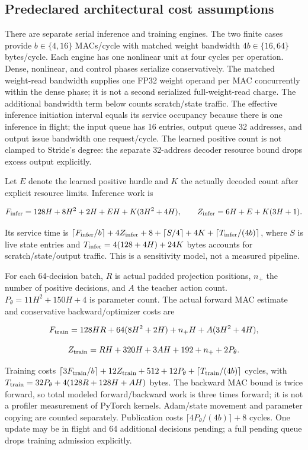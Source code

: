 \documentclass[10pt]{article}
\begin{document}
\subsection{Predeclared architectural cost assumptions}

There are separate serial inference and training engines. The two finite cases provide $b\in\{4,16\}$ MACs/cycle with matched weight bandwidth $4b\in\{16,64\}$ bytes/cycle. Each engine has one nonlinear unit at four cycles per operation. Dense, nonlinear, and control phases serialize conservatively. The matched weight-read bandwidth supplies one FP32 weight operand per MAC concurrently within the dense phase; it is not a second serialized full-weight-read charge. The additional bandwidth term below counts scratch/state traffic. The effective inference initiation interval equals its service occupancy because there is one inference in flight; the input queue has 16 entries, output queue 32 addresses, and output issue bandwidth one request/cycle. The learned positive count is not clamped to Stride's degree: the separate 32-address decoder resource bound drops excess output explicitly.

Let $E$ denote the learned positive hurdle and $K$ the actually decoded count after explicit resource limits. Inference work is

\[F_{\rm infer}=128H+8H^2+2H+EH+K(3H^2+4H),\qquad Z_{\rm infer}=6H+E+K(3H+1).\]

Its service time is $\lceil F_{\rm infer}/b\rceil+4Z_{\rm infer}+8+\lceil S/4\rceil+4K+\lceil T_{\rm infer}/(4b)\rceil$, where $S$ is live state entries and $T_{\rm infer}=4(128+4H)+24K$ bytes accounts for scratch/state/output traffic. This is a sensitivity model, not a measured pipeline.

For each 64-decision batch, $R$ is actual padded projection positions, $n_+$ the number of positive decisions, and $A$ the teacher action count. $P_\theta=11H^2+150H+4$ is parameter count. The actual forward MAC estimate and conservative backward/optimizer costs are

\[F_{\rm train}=128HR+64(8H^2+2H)+n_+H+A(3H^2+4H),\]

\[Z_{\rm train}=RH+320H+3AH+192+n_++2P_\theta.\]

Training costs $\lceil3F_{\rm train}/b\rceil+12Z_{\rm train}+512+12P_\theta+\lceil T_{\rm train}/(4b)\rceil$ cycles, with $T_{\rm train}=32P_\theta+4(128R+128H+AH)$ bytes. The backward MAC bound is twice forward, so total modeled forward/backward work is three times forward; it is not a profiler measurement of PyTorch kernels. Adam/state movement and parameter copying are counted separately. Publication costs $\lceil4P_\theta/(4b)\rceil+8$ cycles. One update may be in flight and 64 additional decisions pending; a full pending queue drops training admission explicitly.
\end{document}
